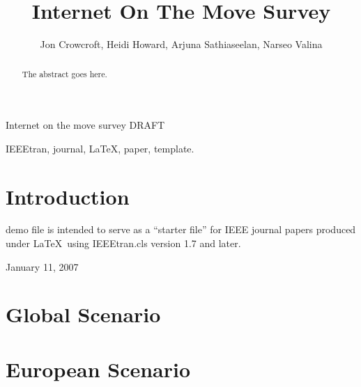 \documentclass[journal]{IEEEtran}
\begin{document}
\title{Internet On The Move Survey}



\author{Jon Crowcroft, Heidi Howard, Arjuna Sathiaseelan, Narseo Valina} %
        

%
{Internet on the move survey DRAFT}


\maketitle


\begin{abstract}
The abstract goes here.
\end{abstract}


\begin{IEEEkeywords}
IEEEtran, journal, \LaTeX, paper, template.
\end{IEEEkeywords}



\section{Introduction}

% 
 demo file is intended to serve as a ``starter file''
for IEEE journal papers produced under \LaTeX\ using
IEEEtran.cls version 1.7 and later.

 
\hfill January 11, 2007

\section{Global Scenario}

\section{European Scenario}
\end{document}
